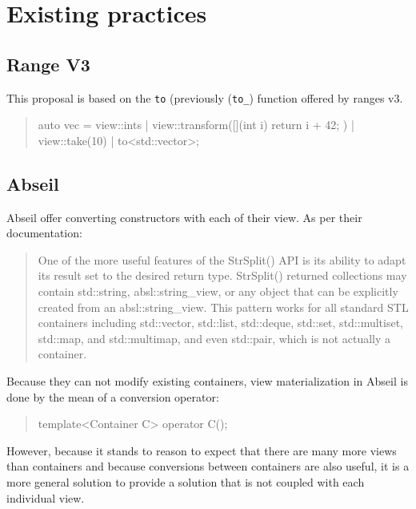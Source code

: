 \documentclass{wg21}
\newcommand{\cc}[1]{\texttt{#1}}
\begin{document}
\section{Existing practices}


\subsection{Range V3}

This proposal is based on the \cc{to} (previously (\cc{to_}) function offered by ranges v3.


\begin{quote}
	\begin{codeblock}
		auto vec = view::ints
		| view::transform([](int i) {
			return i + 42;
		})
		| view::take(10)
		| to<std::vector>;
	\end{codeblock}
\end{quote}



\subsection{Abseil}

Abseil offer converting constructors with each of their view.
As per their documentation:

\begin{quote}
    One of the more useful features of the StrSplit() API is its ability to adapt its result set to the desired return type.
    StrSplit() returned collections may contain std::string, absl::string_view, or any object that can be explicitly created from an absl::string_view.
    This pattern works for all standard STL containers including std::vector,
    std::list, std::deque, std::set, std::multiset, std::map, and std::multimap, and even std::pair, which is not actually a container.
\end{quote}

Because they can not modify existing containers, view materialization in Abseil is done by the mean of a conversion operator:

\begin{quote}
\begin{codeblock}
template<Container C>
operator C();
\end{codeblock}
\end{quote}

However, because it stands to reason to expect that there are many more views than containers and because conversions between containers are also useful,
it is a more general solution to provide a solution that is not coupled with each individual view.
\end{document}
